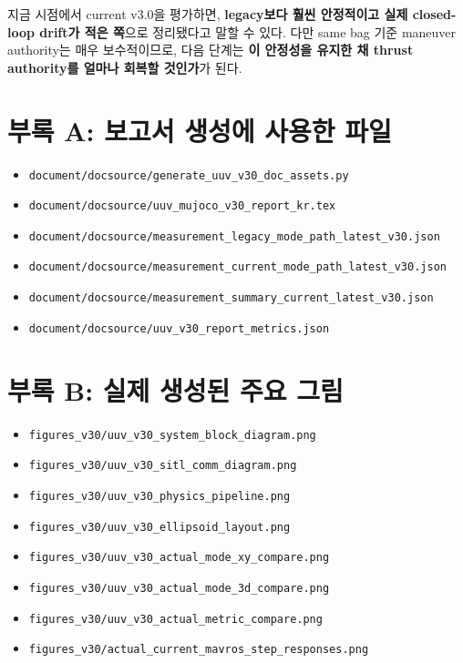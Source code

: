 \documentclass[11pt,a4paper]{article}
\newcommand{\code}[1]{\nolinkurl{#1}}
\begin{document}
지금 시점에서 current v3.0을 평가하면, \textbf{legacy보다 훨씬 안정적이고 실제 closed-loop drift가 적은 쪽}으로 정리됐다고 말할 수 있다. 다만 same bag 기준 maneuver authority는 매우 보수적이므로, 다음 단계는 \textbf{이 안정성을 유지한 채 thrust authority를 얼마나 회복할 것인가}가 된다.

\appendix
\clearpage

\section{부록 A: 보고서 생성에 사용한 파일}

\begin{itemize}[leftmargin=2em]
  \item \code{document/docsource/generate\_uuv\_v30\_doc\_assets.py}
  \item \code{document/docsource/uuv\_mujoco\_v30\_report\_kr.tex}
  \item \code{document/docsource/measurement\_legacy\_mode\_path\_latest\_v30.json}
  \item \code{document/docsource/measurement\_current\_mode\_path\_latest\_v30.json}
  \item \code{document/docsource/measurement\_summary\_current\_latest\_v30.json}
  \item \code{document/docsource/uuv\_v30\_report\_metrics.json}
\end{itemize}

\section{부록 B: 실제 생성된 주요 그림}

\begin{itemize}[leftmargin=2em]
  \item \code{figures\_v30/uuv\_v30\_system\_block\_diagram.png}
  \item \code{figures\_v30/uuv\_v30\_sitl\_comm\_diagram.png}
  \item \code{figures\_v30/uuv\_v30\_physics\_pipeline.png}
  \item \code{figures\_v30/uuv\_v30\_ellipsoid\_layout.png}
  \item \code{figures\_v30/uuv\_v30\_actual\_mode\_xy\_compare.png}
  \item \code{figures\_v30/uuv\_v30\_actual\_mode\_3d\_compare.png}
  \item \code{figures\_v30/uuv\_v30\_actual\_metric\_compare.png}
  \item \code{figures\_v30/actual\_current\_mavros\_step\_responses.png}
\end{itemize}
\end{document}
